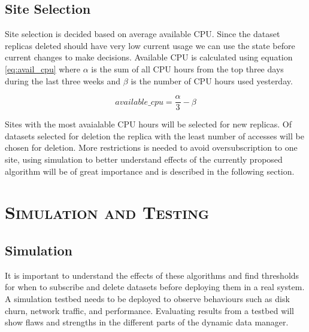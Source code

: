 \documentclass[11pt,a4page]{article}
\begin{document}
  \subsection{Site Selection}
    Site selection is decided based on average available CPU. Since the dataset replicas deleted should have very low current usage we can use the state before current changes to make decisions. Available CPU is calculated using equation \ref{eq:avail_cpu} where $\alpha$ is the sum of all CPU hours from the top three days during the last three weeks and $\beta$ is the number of CPU hours used yesterday.

    \begin{equation}\label{eq:avail_cpu}
      available\_cpu = \frac{\alpha}{3} - \beta
    \end{equation}

    Sites with the most avaialable CPU hours will be selected for new replicas. Of datasets selected for deletion the replica with the least number of accesses will be chosen for deletion. More restrictions is needed to avoid oversubscription to one site, using simulation to better understand effects of the currently proposed algorithm will be of great importance and is described in the following section.


\section{\textsc{Simulation and Testing}}
  \subsection{Simulation}
    It is important to understand the effects of these algorithms and find thresholds for when to subscribe and delete datasets before deploying them in a real system. A simulation testbed needs to be deployed to observe behaviours such as disk churn, network traffic, and performance. Evaluating results from a testbed will show flaws and strengths in the different parts of the dynamic data manager.
\end{document}
